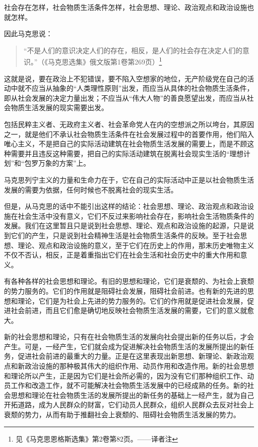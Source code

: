 社会存在怎样，社会物质生活条件怎样，社会思想、理论、政治观点和政治设施也就怎样。

因此马克思说：

\begin{quotation}
“不是人们的意识决定人们的存在，相反，是人们的社会存在决定人们的意识。”（《马克思选集》俄文版第1卷第269页）\footnote{见《马克思恩格斯选集》第2卷第82页。——译者注}
\end{quotation}

这就是说，要在政治上不犯错误，要不陷入空想家的地位，无产阶级党在自己的活动中就不应当从抽象的“人类理性原则”出发，而应当从具体的社会物质生活条件，即从社会发展的决定力量出发；不应当从“伟大人物”的善良愿望出发，而应当从社会物质生活发展的现实需要出发。

包括民粹主义者、无政府主义者、社会革命党人在内的空想派之所以垮台，其原因之一，就是他们不承认社会物质生活条件在社会发展过程中的首要作用，他们陷入唯心主义，不是把自己的实际活动建筑在社会物质生活发展的需要上，而是不顾这种需要并且违反这种需要，把自己的实际活动建筑在脱离社会现实生活的“理想计划”和“包罗万象的方案”上。

马克思列宁主义的力量和生命力在于，它在自己的实际活动中正是以社会物质生活发展的需要为依据，任何时候也不脱离社会的现实生活。

但是，从马克思的话中不能引出这样的结论：社会思想、理论、政治观点和政治设施在社会生活中没有意义，它们不反过来影响社会存在，影响社会生活物质条件的发展。我们在这里暂且只是说到社会思想、理论、观点和政治设施的起源，只是说到它们的产生，只是说到社会精神生活是社会物质生活条件的反映。至于社会思想、理论、观点和政治设施的意义，至于它们在历史上的作用，那末历史唯物主义不仅不否认，相反，正是着重指出它们在社会生活和社会历史中的重大作用和意义。

有各种各样的社会思想和理论。有旧的思想和理论，它们是衰颓的、为社会上衰颓的势力服务的。它们的作用就是阻碍社会发展，阻碍社会前进。也有新的先进的思想和理论，它们是为社会上先进的势力服务的。它们的作用就是促进社会发展，促进社会前进，而且它们愈是确切地反映社会物质生活发展的需要，它们的意义就愈大。

新的社会思想和理论，只有在社会物质生活的发展向社会提出新的任务以后，才会产生。可是，一经产生，它们就会成为促进解决社会物质生活的发展所提出的新任务，促进社会前进的最重大的力量。正是在这里表现出新思想、新理论、新政治观点和新政治设施的那种极其伟大的组织作用、动员作用和改造作用。新的社会思想和理论所以产生，正是因为它们是社会所必需的，因为没有它们那种组织工作、动员工作和改造工作，就不可能解决社会物质生活发展中的已经成熟的任务。新的社会思想和理论在社会物质生活的发展所提出的新任务的基础上一经产生，就为自己开拓道路，成为人民群众的财富，它们动员人民群众，组织人民群众去反对社会上衰颓的势力，从而有助于推翻社会上衰颓的、阻碍社会物质生活发展的势力。

